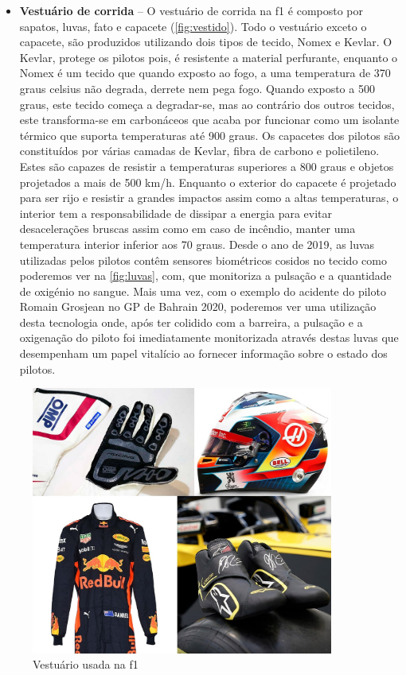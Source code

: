 \documentclass{report}
\begin{document}
\begin{itemize}
\item \textbf{Vestuário de corrida} – O vestuário de corrida na \ac{f1} é composto por sapatos, luvas, fato e capacete (\autoref{fig:vestido}). Todo o vestuário exceto o capacete, são produzidos utilizando dois tipos de tecido, Nomex e Kevlar. O Kevlar, protege os pilotos pois, é resistente a material perfurante, enquanto o Nomex é um tecido que quando exposto ao fogo, a uma temperatura de 370 graus celsius não degrada, derrete nem pega fogo. Quando exposto a 500 graus, este tecido começa a degradar-se, mas ao contrário dos outros tecidos, este transforma-se em carbonáceos que acaba por funcionar como um isolante térmico que suporta temperaturas até 900 graus.
Os capacetes dos pilotos são constituídos por várias camadas de Kevlar, fibra de carbono e polietileno. Estes são capazes de resistir a temperaturas superiores a 800 graus e objetos projetados a mais de 500 km/h. Enquanto o exterior do capacete é projetado para ser rijo e resistir a grandes impactos assim como a altas temperaturas, o interior tem a responsabilidade de dissipar a energia para evitar desacelerações bruscas assim como em caso de incêndio, manter uma temperatura interior inferior aos 70 graus.
Desde o ano de 2019, as luvas utilizadas pelos pilotos contêm sensores biométricos cosidos no tecido como poderemos ver na \autoref{fig:luvas}, com, que monitoriza a pulsação e a quantidade de oxigénio no sangue.
Mais uma vez, com o exemplo do acidente do piloto Romain Grosjean no GP de Bahrain 2020, poderemos ver uma utilização desta tecnologia onde, após ter colidido com a barreira, a pulsação e a oxigenação do piloto foi imediatamente monitorizada através destas luvas que desempenham um papel vitalício ao fornecer informação sobre o estado dos pilotos.\\[1.5cm]


\end{itemize}

\begin{figure}[h]
\center %
\includegraphics[height=250pt]{vestido}
\caption{Vestuário usada na \ac{f1}}
\label{fig:vestido}
\end{figure}
\end{document}
